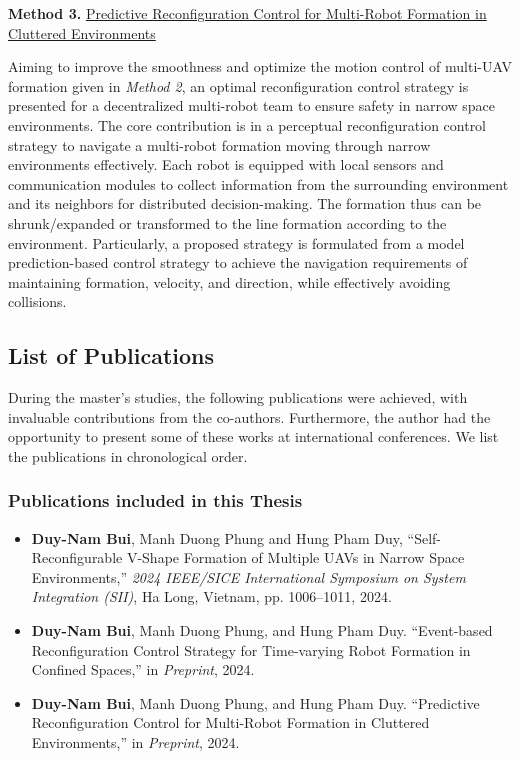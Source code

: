 \noindent \textbf{Method 3.} \hyperref[paper3]{Predictive Reconfiguration Control for Multi-Robot Formation in Cluttered Environments}

Aiming to improve the smoothness and optimize the motion control of multi-UAV formation given in \textit{Method 2}, an optimal reconfiguration control strategy is presented for a decentralized multi-robot team to ensure safety in narrow space environments. The core contribution is in a perceptual reconfiguration control strategy to navigate a multi-robot formation moving through narrow environments effectively. Each robot is equipped with local sensors and communication modules to collect information from the surrounding environment and its neighbors for distributed decision-making. The formation thus can be shrunk/expanded or transformed to the line formation according to the environment. Particularly, a proposed strategy is formulated from a model prediction-based control strategy to achieve the navigation requirements of maintaining formation, velocity, and direction, while effectively avoiding collisions.

\subsection{List of Publications}\label{sec22}
During the master's studies, the following publications were achieved, with invaluable contributions from the co-authors. Furthermore, the author had the opportunity to present some of these works at international conferences. We list the publications in chronological order.
\subsubsection{Publications included in this Thesis}
\begin{itemize}
    \item \textbf{Duy-Nam Bui}, Manh Duong Phung and Hung Pham Duy, ``Self-Reconfigurable V-Shape Formation of Multiple UAVs in Narrow Space Environments,'' \textit{2024 IEEE/SICE International Symposium on System Integration (SII)}, Ha Long, Vietnam, pp. 1006--1011, 2024.
        \item \textbf{Duy-Nam Bui}, Manh Duong Phung, and Hung Pham Duy. ``Event-based Reconfiguration Control Strategy for Time-varying Robot Formation in Confined Spaces,'' in \textit{Preprint}, 2024.
    \item \textbf{Duy-Nam Bui}, Manh Duong Phung, and Hung Pham Duy. ``Predictive Reconfiguration Control for Multi-Robot Formation in Cluttered Environments,'' in \textit{Preprint}, 2024.
\end{itemize}
